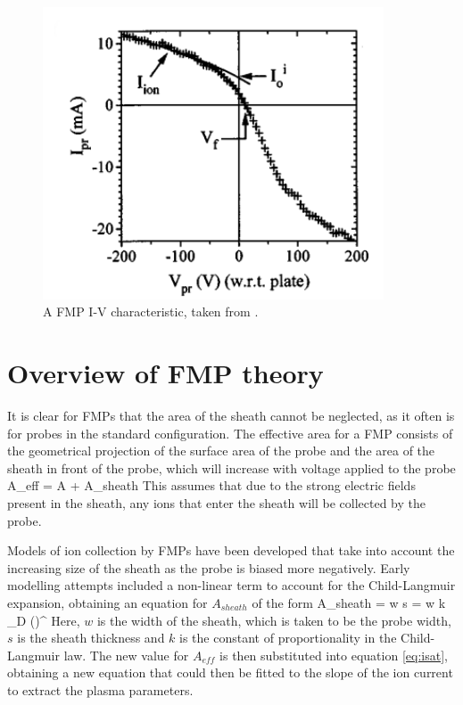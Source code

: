  
\begin{figure}[H]
\centering
\includegraphics[width=0.9\textwidth]{non_sat.png}
\caption{A FMP I-V characteristic, taken from \cite{gunn_magnetisation}.}
\label{fig:non-sat}
\end{figure}



\section{Overview of FMP theory}
It is clear for FMPs that the area of the sheath cannot be neglected, as it often is for probes in the standard configuration. The effective area for a FMP consists of the geometrical projection of the surface area of the probe and the area of the sheath in front of the probe, which will increase with voltage applied to the probe
\be 
A_{eff} = A \sin{\theta} + A_{sheath}
\ee 
This assumes that due to the strong electric fields present in the sheath, any ions that enter the sheath will be collected by the probe.

 Models of ion collection by FMPs have been developed that take into account the increasing size of the sheath as the probe is biased more negatively. Early modelling attempts included a non-linear term to account for the Child-Langmuir expansion, obtaining an equation for $A_{sheath}$ of the form
\be 
A_{sheath} = w \times s = w k \lambda_D {\left(\right)}^
\ee 
Here, $w$ is the width of the sheath, which is taken to be the probe width, $s$ is the sheath thickness and $k$ is the constant of proportionality in the Child-Langmuir law. The new value for $A_{eff}$ is then substituted into equation \ref{eq:isat}, obtaining a new equation that could then be fitted to the slope of the ion current to extract the plasma parameters.

